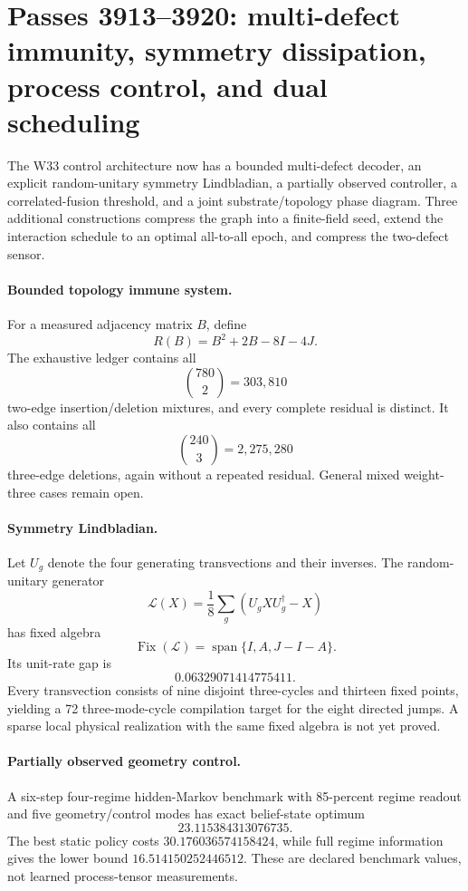 \section{Passes 3913--3920: multi-defect immunity, symmetry dissipation, process control, and dual scheduling}
\label{sec:bt3913-3920}

The W33 control architecture now has a bounded multi-defect decoder, an explicit random-unitary symmetry Lindbladian, a partially observed controller, a correlated-fusion threshold, and a joint substrate/topology phase diagram.  Three additional constructions compress the graph into a finite-field seed, extend the interaction schedule to an optimal all-to-all epoch, and compress the two-defect sensor.

\paragraph{Bounded topology immune system.}
For a measured adjacency matrix $B$, define
\[
R(B)=B^2+2B-8I-4J.
\]
The exhaustive ledger contains all
\[
\binom{780}{2}=303{,}810
\]
two-edge insertion/deletion mixtures, and every complete residual is distinct.  It also contains all
\[
\binom{240}{3}=2{,}275{,}280
\]
three-edge deletions, again without a repeated residual.  General mixed weight-three cases remain open.

\paragraph{Symmetry Lindbladian.}
Let $U_g$ denote the four generating transvections and their inverses.  The random-unitary generator
\[
\mathcal L(X)=\frac18\sum_g(U_gXU_g^\dagger-X)
\]
has fixed algebra
\[
\operatorname{Fix}(\mathcal L)=\operatorname{span}\{I,A,J-I-A\}.
\]
Its unit-rate gap is
\[
0.06329071414775411.
\]
Every transvection consists of nine disjoint three-cycles and thirteen fixed points, yielding a 72 three-mode-cycle compilation target for the eight directed jumps.  A sparse local physical realization with the same fixed algebra is not yet proved.

\paragraph{Partially observed geometry control.}
A six-step four-regime hidden-Markov benchmark with 85-percent regime readout and five geometry/control modes has exact belief-state optimum
\[
23.115384313076735.
\]
The best static policy costs $30.176036574158424$, while full regime information gives the lower bound $16.514150252446512$.  These are declared benchmark values, not learned process-tensor measurements.

